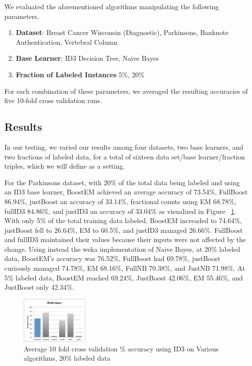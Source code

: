 \documentclass{sig-alternate}
\begin{document}
We evaluated the aforementioned algorithms manipulating the following parameters.

\begin{enumerate}
\item \textbf{Dataset}: Breast Cancer Wisconsin (Diagnostic), Parkinsons, Banknote Authentication, Vertebral Column
\item \textbf{Base Learner}: ID3 Decision Tree, Naive Bayes
\item \textbf{Fraction of Labeled Instances} 5\%, 20\%
\end{enumerate}

For each combination of these parameters, we averaged the resulting accuracies of five 10-fold cross validation runs. 

\subsection{Results}

In our testing, we varied our results among four datasets, two base learners, and two fractions of labeled data, for a total of sixteen data set/base learner/fraction triples, which we will define as a setting.  

For the Parkinsons dataset, with $20\%$ of the total data being labeled and using an ID3 base learner, BoostEM achieved an average accuracy of 73.54\%, FullBoost 86.94\%, justBoost an accuracy of 33.14\%, fractional counts using EM 68.78\%, fullID3 84.86\%, and justID3 an accuracy of 33.04\% as visualized in Figure ~\ref{parkAcc}. With only 5\% of the total training data labeled, BoostEM increaded to 74.64\%, justBoost fell to 26.64\%, EM to 60.5\%, and justID3 managed 26.66\%.  FullBoost and fullID3 maintained their values because their inputs were not affected by the change. 
Using instead the weka implementation of Naive Bayes, at 20\% labeled data, BoostEM's accuracy was 76.52\%, FullBoost had 69.78\%, justBoost curiously managed 74.78\%, EM 68.16\%, FullNB 70.38\%, and JustNB 71.98\%. At 5\% labeled data, BoostEM reached 69.24\%, JustBoost 42.06\%, EM 55.46\%, and JustBoost only 42.34\%.

\begin{figure}
\centering
\includegraphics[width=0.3\textwidth]{figures/parkAcc.pdf}
\caption{Average 10 fold cross validation \% accuracy using ID3 on Various algorithms, 20\% labeled data}
\label{parkAcc}
\end{figure}
\end{document}
